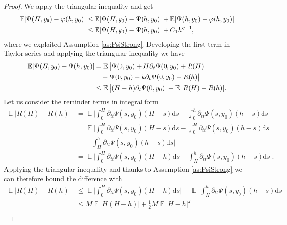 \documentclass{siamart1116}
\numberwithin{theorem}{section}
\DeclarePairedDelimiter{\abs}{\lvert}{\rvert}
\renewcommand{\phi}{\varphi}
\newcommand{\E}{\operatorname{\mathbb{E}}}
\newcommand{\dd}{\mathrm{d}}
\begin{document}
\begin{proof} We apply the triangular inequality and get
	\begin{equation}\label{eq:firstStepStrong}
	\begin{aligned}
	\E\abs{\Psi(H, y_0) - \phi(h, y_0)} &\leq \E\abs{\Psi(H, y_0) - \Psi(h, y_0)} + \E\abs{\Psi(h, y_0) - \phi(h, y_0)} \\
	&\leq \E\abs{\Psi(H, y_0) - \Psi(h, y_0)} + C_1h^{q+1},
	\end{aligned}
	\end{equation}
	where we exploited Assumption \ref{as:PsiStrong}. Developing the first term in Taylor series and applying the triangular inequality we have
	\begin{equation}
	\begin{aligned}
	\E\abs{\Psi(H, y_0) - \Psi(h, y_0)} &= \E\big|\Psi(0, y_0) + H\partial_t{\Psi} (0, y_0) + R(H) \\
	&\quad - \Psi(0, y_0) - h\partial_t{\Psi} (0, y_0) - R(h) \big| \\
	&\leq \E\big|(H - h)\partial_t{\Psi} (0, y_0)\big| + \E|R(H) - R(h)|.
	\end{aligned}
	\end{equation}
	Let us consider the reminder terms in integral form
	\begin{equation}
	\begin{aligned}
	\E|R(H) - R(h)| &= \E\Big| \int_{0}^{H}\partial_{tt}\Psi (s, y_0)(H-s)\dd s - \int_{0}^{h}\partial_{tt}\Psi (s, y_0)(h-s)\dd s \Big|\\
	&= \E\Big| \int_{0}^{H}\partial_{tt}\Psi (s, y_0)(H-s)\dd s - \int_{0}^{H}\partial_{tt}\Psi (s, y_0)(h-s)\dd s \\
	&\quad - \int_{H}^{h}\partial_{tt}\Psi (s, y_0)(h-s)\dd s \Big|\\
	&= \E\Big| \int_{0}^{H}\partial_{tt}\Psi (s, y_0)(H-h)\dd s - \int_{H}^{h}\partial_{tt}\Psi (s, y_0)(h-s)\dd s\Big|.
	\end{aligned}
	\end{equation}
	Applying the triangular inequality and thanks to Assumption \ref{as:PsiStrong} we can therefore bound the difference with
	\begin{equation}
	\begin{aligned}
	\E|R(H) - R(h)| &\leq \E\Big|\int_{0}^{H}\partial_{tt}\Psi (s, y_0)(H-h)\dd s \Big| + \E\Big|  \int_{H}^{h}\partial_{tt}\Psi (s, y_0)(h-s)\dd s \Big| \\
	&\leq M \E|H(H-h)| + \frac{1}{2}M\E|H-h|^2 \\

\end{aligned}
\end{equation}
\end{proof}
\end{document}
